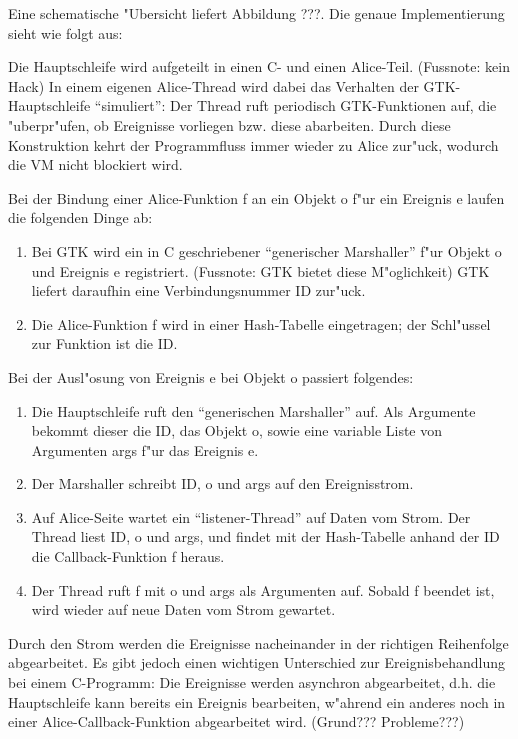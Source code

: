 \documentclass{article}
\begin{document}
Eine schematische "Ubersicht liefert Abbildung ???.
Die genaue Implementierung sieht wie folgt aus:

Die Hauptschleife wird aufgeteilt in einen C- und einen Alice-Teil.
(Fussnote: kein Hack) In einem eigenen Alice-Thread wird dabei das Verhalten
der GTK-Hauptschleife ``simuliert'': Der Thread ruft periodisch
GTK-Funktionen auf, die "uberpr"ufen, ob Ereignisse vorliegen bzw. diese
abarbeiten. Durch diese Konstruktion kehrt der Programmfluss immer wieder
zu Alice zur"uck, wodurch die VM nicht blockiert wird.

Bei der Bindung einer Alice-Funktion f an ein Objekt o f"ur ein Ereignis e
laufen die folgenden Dinge ab:

\begin{enumerate}
\item Bei GTK wird ein in C geschriebener ``generischer Marshaller''
      f"ur Objekt o und Ereignis e registriert. (Fussnote: GTK bietet diese
      M"oglichkeit) GTK liefert daraufhin eine Verbindungsnummer ID zur"uck.
\item Die Alice-Funktion f wird in einer Hash-Tabelle eingetragen;
      der Schl"ussel zur Funktion ist die ID.
\end{enumerate}

Bei der Ausl"osung von Ereignis e bei Objekt o passiert folgendes:

\begin{enumerate}
\item Die Hauptschleife ruft den ``generischen Marshaller'' auf. Als Argumente
      bekommt dieser die ID, das Objekt o, sowie eine variable Liste von
      Argumenten args f"ur das Ereignis e.
\item Der Marshaller schreibt ID, o und args auf den Ereignisstrom.
\item Auf Alice-Seite wartet ein ``listener-Thread'' auf Daten vom Strom.
      Der Thread liest ID, o und args, und findet mit der Hash-Tabelle anhand
      der ID die Callback-Funktion f heraus.
\item Der Thread ruft f mit o und args als Argumenten auf. Sobald f beendet
      ist, wird wieder auf neue Daten vom Strom gewartet.
\end{enumerate}

Durch den Strom werden die Ereignisse nacheinander in der richtigen
Reihenfolge abgearbeitet. Es gibt jedoch einen wichtigen Unterschied
zur Ereignisbehandlung bei einem C-Programm: Die Ereignisse werden asynchron
abgearbeitet, d.h. die Hauptschleife kann bereits ein Ereignis bearbeiten,
w"ahrend ein anderes noch in einer Alice-Callback-Funktion abgearbeitet wird.
(Grund??? Probleme???)
\end{document}
